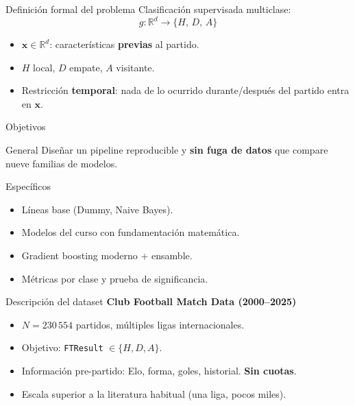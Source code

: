 \documentclass[aspectratio=169]{beamer}
\begin{document}
\begin{frame}{Definición formal del problema}
  Clasificación supervisada multiclase:
  \[
    g:\mathbb{R}^{d}\rightarrow\{H,\,D,\,A\}
  \]
  \begin{itemize}
    \item $\mathbf{x}\in\mathbb{R}^{d}$: características \textbf{previas} al partido.
    \item $H$ local, $D$ empate, $A$ visitante.
    \item Restricción \textbf{temporal}: nada de lo ocurrido durante/después del partido entra en $\mathbf{x}$.
  \end{itemize}
\end{frame}

\begin{frame}{Objetivos}
  \begin{block}{General}
    Diseñar un pipeline reproducible y \textbf{sin fuga de datos} que compare nueve familias
    de modelos.
  \end{block}
  \begin{block}{Específicos}
    \begin{itemize}
      \item Líneas base (Dummy, Naive Bayes).
      \item Modelos del curso con fundamentación matemática.
      \item Gradient boosting moderno + ensamble.
      \item Métricas por clase y prueba de significancia.
    \end{itemize}
  \end{block}
\end{frame}

\begin{frame}{Descripción del dataset}
  \textbf{Club Football Match Data (2000--2025)}
  \begin{itemize}
    \item $N = 230\,554$ partidos, múltiples ligas internacionales.
    \item Objetivo: \texttt{FTResult} $\in \{H, D, A\}$.
    \item Información pre-partido: Elo, forma, goles, historial. \textbf{Sin cuotas}.
    \item Escala superior a la literatura habitual (una liga, pocos miles).
  \end{itemize}
\end{frame}
\end{document}
